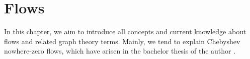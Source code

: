 \chapter{Flows} %

In this chapter, we aim to introduce all concepts and current knowledge about flows and related graph theory terms. Mainly, we tend to explain Chebyshev nowhere-zero flows, which
have arisen in the bachelor thesis of the author \cite{TODO}.

